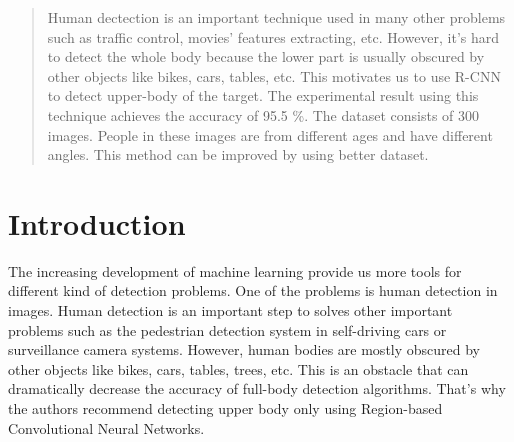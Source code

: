 \documentclass[conference]{IEEEtran}
\begin{document}




\maketitle

\begin{abstract}
Human dectection is an important technique used in many other problems such as traffic control, movies' features extracting, etc. However, it's hard to detect the whole body because the lower part is usually obscured by other objects like bikes, cars, tables, etc. This motivates us to use R-CNN to detect upper-body of the target. The experimental result using this technique achieves the accuracy of 95.5 \%. The dataset consists of 300 images. People in these images are from different ages and have different angles. This method can be improved by using better dataset.
\end{abstract}





%
\IEEEpeerreviewmaketitle



\section{Introduction}
The increasing development of machine learning provide us more tools for different kind of detection problems. One of the problems is human detection in images. Human detection is an important step to solves other important problems such as the pedestrian detection system in self-driving cars or surveillance camera systems. However, human bodies are mostly obscured by other objects like bikes, cars, tables, trees, etc. This is an obstacle that can dramatically decrease the accuracy of full-body detection algorithms. That's why the authors recommend detecting upper body only using Region-based Convolutional Neural Networks.
\end{document}

